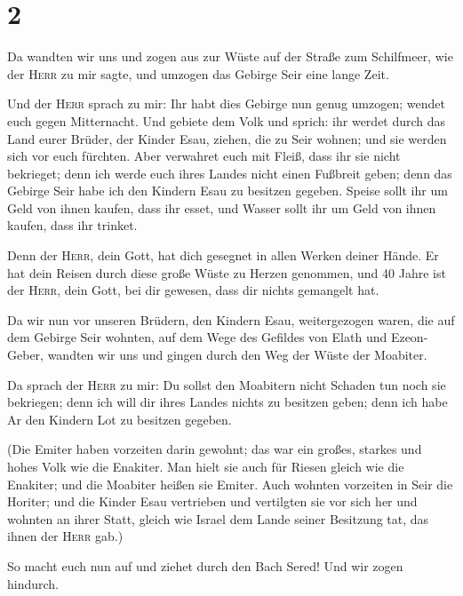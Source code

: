 \hypertarget{section-1}{%
\section{2}\label{section-1}}

 Da wandten wir uns und zogen aus zur Wüste auf der Straße
zum Schilfmeer, wie der \textsc{Herr} zu mir sagte, und umzogen das
Gebirge Seir eine lange Zeit.

 Und der \textsc{Herr} sprach zu mir:  Ihr
habt dies Gebirge nun genug umzogen; wendet euch gegen Mitternacht.
 Und gebiete dem Volk und sprich: ihr werdet durch das
Land eurer Brüder, der Kinder Esau, ziehen, die zu Seir wohnen; und sie
werden sich vor euch fürchten. Aber verwahret euch mit Fleiß,
 dass ihr sie nicht bekrieget; denn ich werde euch ihres
Landes nicht einen Fußbreit geben; denn das Gebirge Seir habe ich den
Kindern Esau zu besitzen gegeben.  Speise sollt ihr um
Geld von ihnen kaufen, dass ihr esset, und Wasser sollt ihr um Geld von
ihnen kaufen, dass ihr trinket.

 Denn der \textsc{Herr}, dein Gott, hat dich gesegnet in
allen Werken deiner Hände. Er hat dein Reisen durch diese große Wüste zu
Herzen genommen, und 40 Jahre ist der \textsc{Herr}, dein Gott, bei dir
gewesen, dass dir nichts gemangelt hat.

 Da wir nun vor unseren Brüdern, den Kindern Esau,
weitergezogen waren, die auf dem Gebirge Seir wohnten, auf dem Wege des
Gefildes von Elath und Ezeon-Geber, wandten wir uns und gingen durch den
Weg der Wüste der Moabiter.

 Da sprach der \textsc{Herr} zu mir: Du sollst den
Moabitern nicht Schaden tun noch sie bekriegen; denn ich will dir ihres
Landes nichts zu besitzen geben; denn ich habe Ar den Kindern Lot zu
besitzen gegeben.

 (Die Emiter haben vorzeiten darin gewohnt; das war ein
großes, starkes und hohes Volk wie die Enakiter.  Man
hielt sie auch für Riesen gleich wie die Enakiter; und die Moabiter
heißen sie Emiter.  Auch wohnten vorzeiten in Seir die
Horiter; und die Kinder Esau vertrieben und vertilgten sie vor sich her
und wohnten an ihrer Statt, gleich wie Israel dem Lande seiner Besitzung
tat, das ihnen der \textsc{Herr} gab.)

 So macht euch nun auf und ziehet durch den Bach Sered!
Und wir zogen hindurch.

